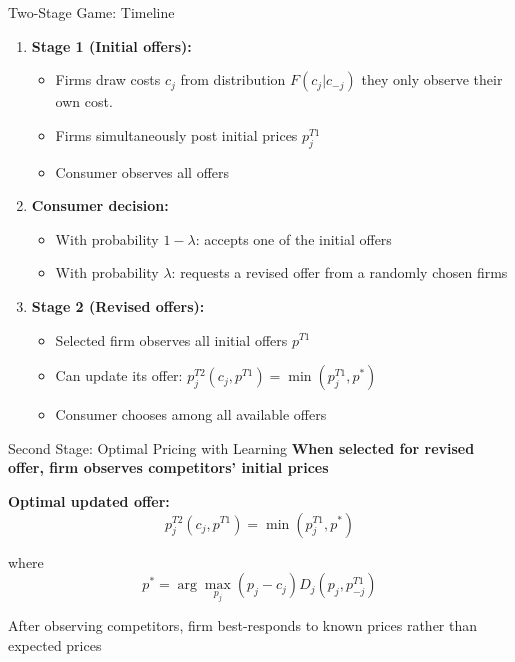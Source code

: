 \documentclass[10pt,aspectratio=169]{beamer}
\begin{document}

\begin{frame}{Two-Stage Game: Timeline}\label{slide:timeline}
\begin{enumerate}
    \item \textbf{Stage 1 (Initial offers):} \hyperlink{slide:connection}{}

    \begin{itemize}
        \item Firms draw costs $c_j$ from distribution $F(c_j|c_{-j})$ they only observe their own cost.
        \item Firms simultaneously post initial prices $p^{T1}_j$
        \item Consumer observes all offers
    \end{itemize}
    
    \vspace{0.3cm}
    
    \item \textbf{Consumer decision:}
    \begin{itemize}
        \item With probability $1-\lambda$: accepts one of the initial offers
        \item With probability $\lambda$: requests a revised offer from a randomly chosen firms
    \end{itemize}
    
    \vspace{0.3cm}
    
    \item \textbf{Stage 2 (Revised offers):}
    \begin{itemize}
        \item Selected firm observes all initial offers $p^{T1}$
        \item Can update its offer: $p^{T2}_j(c_j, p^{T1}) = \min(p^{T1}_j, p^*)$
        \item Consumer chooses among all available offers
    \end{itemize}
\end{enumerate}
\end{frame}


\begin{frame}{Second Stage: Optimal Pricing with Learning}
\textbf{When selected for revised offer, firm observes competitors' initial prices}

\vspace{0.3cm}

\textbf{Optimal updated offer:}
$$p^{T2}_j(c_j, p^{T1}) = \min(p^{T1}_j, p^*)$$

where
$$p^* = \arg\max_{p_j} (p_j - c_j) D_j(p_j, p^{T1}_{-j})$$

\vspace{0.3cm}
After observing competitors, firm best-responds to known prices rather than expected prices
\end{frame}
\end{document}
